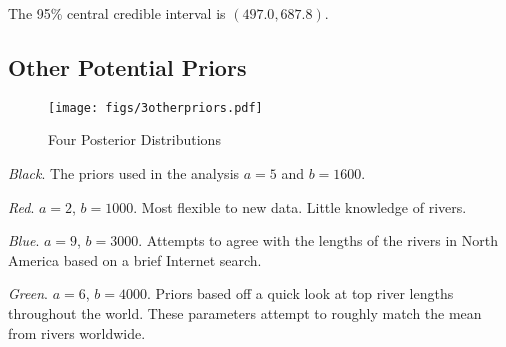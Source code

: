 \documentclass[12pt]{article}
\begin{document}
\noindent The 95\% central credible interval is $(497.0, 687.8)$.

\subsection{Other Potential Priors}


\begin{figure}[H]
\begin{center}
\texttt{[image: figs/3otherpriors.pdf]}
\caption{Four Posterior Distributions}
\end{center}
\end{figure}

\noindent \emph{Black}.  The priors used in the analysis $a=5$ and $b=1600$.

\noindent \emph{Red}. $a=2$, $b=1000$.  Most flexible to new data. Little knowledge of rivers.

\noindent \emph{Blue}. $a=9$, $b=3000$.  Attempts to agree with the lengths of the rivers in North America based on a brief Internet search.

\noindent \emph{Green}. $a=6$, $b=4000$.  Priors based off a quick look at top river lengths throughout the world. These parameters attempt to roughly match the mean from rivers worldwide.


%
%
%
\end{document}
